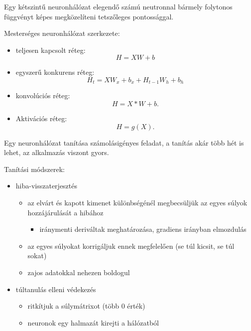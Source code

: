 \begin{tetel}
    Egy kétszintű neuronhálózat elegendő számú neutronnal bármely folytonos
    függvényt képes megközelíteni tetszőleges pontossággal.
\end{tetel}

\begin{tetel}
    Mesterséges neuronhálózat szerkezete:

    \begin{itemize}
        \item teljesen kapcsolt réteg: \[
            H = XW + b
        \]
        \item  egyszerű konkurens réteg: \[
            H_t = XW_x + b_x + H_{t-1}W_h + b_h
        \]
        \item konvolúciós réteg: \[
            H = X * W + b
        .\]
        \item Aktivációs réteg: \[
            H = g(X)
        .\]
    \end{itemize}
\end{tetel}

Egy neuronhálózat tanítása számolásigényes feladat, a tanítás akár több hét is
lehet, az alkalmazás viszont gyors.

Tanítási módszerek:
\begin{itemize}
    \item hiba-visszaterjesztés
        \begin{itemize}
            \item az elvárt és kapott kimenet különbségénél megbecsüljük az egyes
                súlyok hozzájárulását a hibához
                \begin{itemize}
                    \item iránymenti deriváltak meghatározása, gradiens
                        irányban elmozdulás
                \end{itemize}
            \item az egyes súlyokat korrigáljuk ennek megfelelően (se túl kicsit, se túl sokat)
            \item zajos adatokkal nehezen boldogul
        \end{itemize}
    \item túltanulás elleni védekezés
        \begin{itemize}
            \item ritkítjuk a súlymátrixot (több $0$ érték)
            \item neuronok egy halmazát kirejti a hálózatból
        \end{itemize}
\end{itemize}

